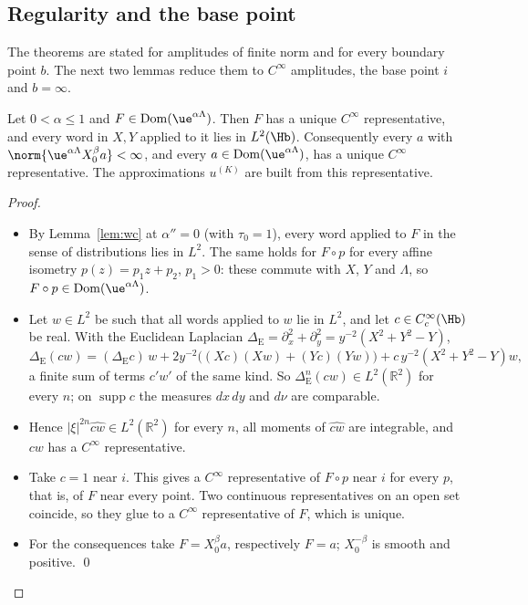 \subsection{Regularity and the base point}\label{subsec:dd-base}

The theorems are stated for amplitudes of finite norm and for every boundary point $b$. The next two lemmas reduce them to
$C^\infty$ amplitudes, the base point $i$ and $b=\infty$.

\begin{lemma}[regularity]\label{lem:lift}
Let $0<\alpha\le1$ and $F\in\operatorname{Dom}(\ue^{\alpha\Lambda})$. Then $F$ has a unique $C^\infty$ representative, and every word in
$X,Y$ applied to it lies in $L^2(\Hb)$. Consequently every $a$ with $\norm{\ue^{\alpha\Lambda}X_0^\beta a}<\infty$, and every
$a\in\operatorname{Dom}(\ue^{\alpha\Lambda})$, has a unique $C^\infty$ representative. The approximations $u^{(K)}$ are built from this
representative.
\end{lemma}

\begin{proof}
\begin{itemize}
\item By Lemma~\ref{lem:wc} at $\alpha''=0$ (with $\tau_0=1$), every word applied to $F$ in the sense of distributions lies in $L^2$. The same holds
for $F\circ p$ for every affine isometry $p(z)=p_1z+p_2$, $p_1>0$: these commute with $X$, $Y$ and $\Lambda$, so
$F\circ p\in\operatorname{Dom}(\ue^{\alpha\Lambda})$.
\item Let $w\in L^2$ be such that all words applied to $w$ lie in $L^2$, and let $c\in C_c^\infty(\Hb)$ be real. With the Euclidean
Laplacian $\Delta_{\mathrm E}=\partial_x^2+\partial_y^2=y^{-2}(X^2+Y^2-Y)$,
\[
\Delta_{\mathrm E}(cw)=(\Delta_{\mathrm E}c)\,w+2y^{-2}\bigl((Xc)(Xw)+(Yc)(Yw)\bigr)+c\,y^{-2}(X^2+Y^2-Y)w,
\]
a finite sum of terms $c'w'$ of the same kind. So $\Delta_{\mathrm E}^n(cw)\in L^2(\mathbb R^2)$ for every $n$; on $\operatorname{supp}c$
the measures $dx\,dy$ and $d\nu$ are comparable.
\item Hence $|\xi|^{2n}\widehat{cw}\in L^2(\mathbb R^2)$ for every $n$, all moments of $\widehat{cw}$ are integrable, and $cw$ has a
$C^\infty$ representative.
\item Take $c=1$ near $i$. This gives a $C^\infty$ representative of $F\circ p$ near $i$ for every $p$, that is, of $F$ near
every point. Two continuous representatives on an open set coincide, so they glue to a $C^\infty$ representative of $F$, which is unique.
\item For the consequences take $F=X_0^\beta a$, respectively $F=a$; $X_0^{-\beta}$ is smooth and positive. \qed
\end{itemize}
\end{proof}

